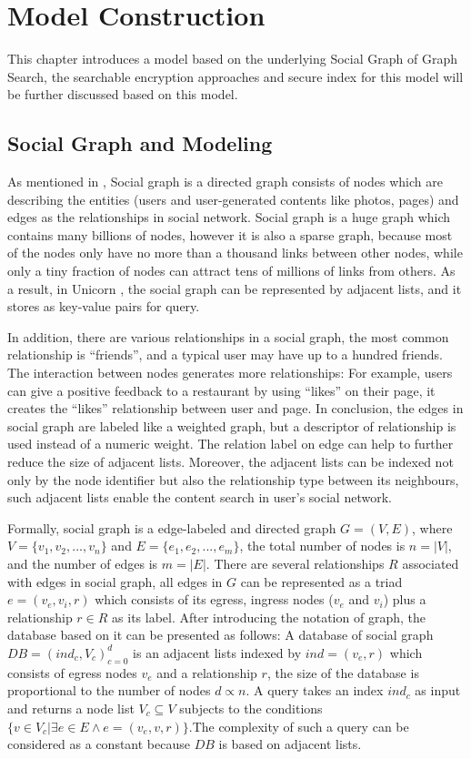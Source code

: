 \chapter{Model Construction}
This chapter introduces a model based on the underlying Social Graph of Graph Search, the searchable encryption approaches and secure index for this model will be further discussed based on this model.

\section{Social Graph and Modeling}
As mentioned in \cite{curtiss2013unicorn}, Social graph is a directed graph consists of nodes which are describing the entities (users and user-generated contents like photos, pages) and edges as the relationships in social network. Social graph is a huge graph which contains many billions of nodes, however it is also a sparse graph, because most of the nodes only have no more than a thousand links between other nodes, while only a tiny fraction of nodes can attract tens of millions of links from others. As a result, in Unicorn \cite{curtiss2013unicorn}, the social graph can be represented by adjacent lists, and it stores as key-value pairs for query. 

In addition, there are various relationships in a social graph, the most common relationship is ``friends'', and a typical user may have up to a hundred friends. The interaction between nodes generates more relationships: For example, users can give a positive feedback to a restaurant by using ``likes'' on their page, it creates the ``likes'' relationship between user and page. In conclusion, the edges in social graph are labeled like a weighted graph, but a descriptor of relationship is used instead of a numeric weight. The relation label on edge can help to further reduce the size of adjacent lists. Moreover, the adjacent lists can be indexed not only by the node identifier but also the relationship type between its neighbours, such adjacent lists enable the content search in user's social network.

Formally, social graph is a edge-labeled and directed graph $G = (V, E)$, where $V = \{v_1, v_2, ..., v_n\}$ and $E = \{e_1, e_2, ..., e_m\}$, the total number of nodes is $n = |V|$, and the number of edges is $m = |E|$. There are several relationships $R$ associated with edges in social graph, all edges in $G$ can be represented as a triad $e = (v_e, v_i, r)$ which consists of its egress, ingress nodes ($v_e$ and $v_i$) plus a relationship $r\in R$ as its label. After introducing the notation of graph, the database based on it can be presented as follows: A database of social graph $DB = (ind_c, V_c)_{c=0}^{d}$ is an adjacent lists indexed by $ind = (v_e, r)$ which consists of egress nodes $v_e$ and a relationship $r$, the size of the database is proportional to the number of nodes $d \propto n$. A query takes an index $ind_c$ as input and returns a node list $V_c \subseteq V$ subjects to the conditions $\{v\in V_c | \exists e\in E \land e= (v_e, v, r)\}$.The complexity of such a query can be considered as a constant because $DB$ is based on adjacent lists.